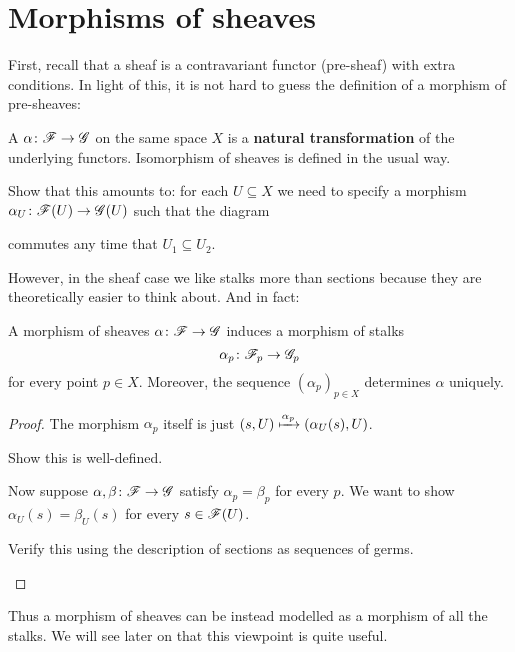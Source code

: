 \section{Morphisms of sheaves}
First, recall that a sheaf is a contravariant functor (pre-sheaf)
with extra conditions. In light of this, it is not hard to guess
the definition of a morphism of pre-sheaves:
\begin{definition}
	A  $\alpha \colon \mathscr F \to \mathscr G$ on the same
	space $X$ is a \textbf{natural transformation} of the underlying functors.
	Isomorphism of sheaves is defined in the usual way.
\end{definition}
\begin{ques}
	Show that this amounts to: for each $U \subseteq X$ we need to specify
	a morphism $\alpha_U \colon \mathscr F(U) \to \mathscr G(U)$ such that the diagram
	\begin{center}
	\end{center}
	commutes any time that $U_1 \subseteq U_2$.
\end{ques}
However, in the sheaf case we like stalks more than sections because
they are theoretically easier to think about.
And in fact:
\begin{proposition}
	A morphism of sheaves $\alpha \colon \mathscr F \to \mathscr G$ induces a morphism of stalks
	\[ \alpha_p \colon \mathscr F_p \to \mathscr G_p \]
	for every point $p \in X$.
	Moreover, the sequence $(\alpha_p)_{p \in X}$ determines $\alpha$ uniquely.
\end{proposition}
\begin{proof}
	The morphism $\alpha_p$ itself is just
	$(s, U) \xmapsto{\alpha_p} (\alpha_U(s), U)$.
	\begin{ques}
		Show this is well-defined.
	\end{ques}
	Now suppose $\alpha , \beta \colon \mathscr F \to \mathscr G$ satisfy $\alpha_p = \beta_p$
	for every $p$. We want to show $\alpha_U(s) = \beta_U(s)$
	for every $s \in \mathscr F(U)$.
	\begin{ques}
		Verify this using the description of sections
		as sequences of germs. \qedhere
	\end{ques}
\end{proof}
Thus a morphism of sheaves can be instead modelled as a morphism
of all the stalks. We will see later on that this viewpoint is quite useful.
